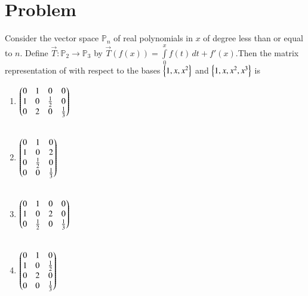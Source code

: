 \documentclass[journal,12pt]{IEEEtran}
\begin{document}
\section{\textbf{Problem}}
Consider the vector space $\mathbb{P}_{n}$ of real polynomials in ${x}$ of degree less than or equal to ${n}$. Define $\vec{T} : \mathbb{P}_{2}\rightarrow \mathbb{P}_{3}$ by $\vec{T}(f(x))=\int\limits_0^xf(t)\,dt+f'(x)$.Then the matrix  representation of  with respect to the bases $\left\{1,x,x^2\right\}$ and $\left\{1,x,x^2,x^3\right\}$ is \\
\begin{enumerate}
\item  $\begin{pmatrix}0&1&0&0\\1&0&\frac{1}{2}&0\\0&2&0&\frac{1}{3}\end{pmatrix}$\\\\
\item $\begin{pmatrix}0&1&0\\1&0&2\\0&\frac{1}{2}&0\\0&0&\frac{1}{3}\end{pmatrix}$ \\\\
\item  $\begin{pmatrix}0&1&0&0\\1&0&2&0\\0&\frac{1}{2}&0&\frac{1}{3}\end{pmatrix}$ \\\\
\item $\begin{pmatrix}0&1&0\\1&0&\frac{1}{2}\\0&2&0\\0&0&\frac{1}{3}\end{pmatrix}$ 
\end{enumerate}
\end{document}

